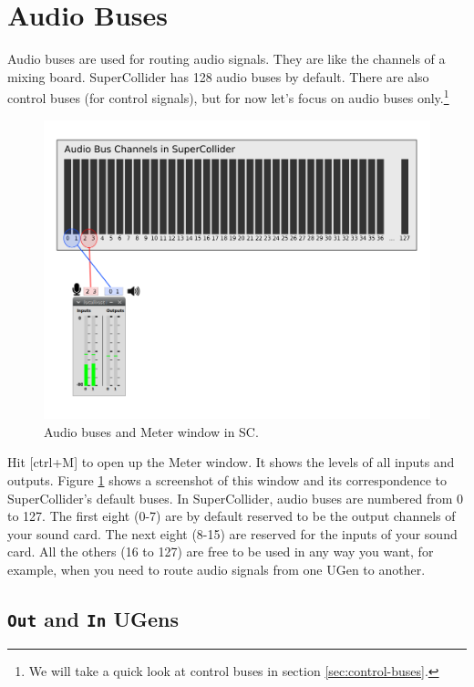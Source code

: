 \section{Audio Buses}
\label{sec:audiobus}

Audio buses are used for routing audio signals. They are like the channels of a mixing board. SuperCollider has 128 audio buses by default. There are also control buses (for control signals), but for now let's focus on audio buses only.\footnote{We will take a quick look at control buses in section \ref{sec:control-buses}.}

\begin{figure}[h!]
\centerline{
	\includegraphics[scale=0.4]{fig-audio-bus-stereo.png}}
\caption{Audio buses and Meter window in SC.}
\label{fig:audio-bus-stereo}
\end{figure}

Hit [ctrl+M] to open up the Meter window. It shows the levels of all inputs and outputs. Figure \ref{fig:audio-bus-stereo} shows a screenshot of this window and its correspondence to SuperCollider's default buses. In SuperCollider, audio buses are numbered from 0 to 127. The first eight (0-7) are by default reserved to be the output channels of your sound card. The next eight (8-15) are reserved for the inputs of your sound card. All the others (16 to 127) are free to be used in any way you want, for example, when you need to route audio signals from one UGen to another.

\subsection{\texttt{Out} and \texttt{In} UGens}

